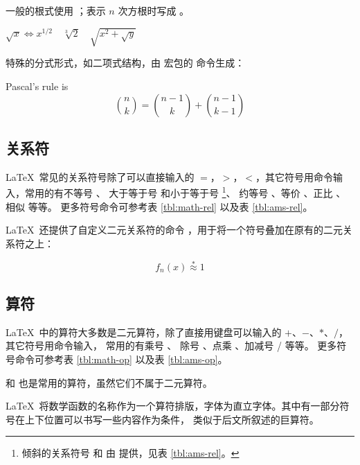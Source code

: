 一般的根式使用 ；表示 $n$ 次方根时写成 。
\begin{example}
$\sqrt{x} \Leftrightarrow x^{1/2}
\quad \sqrt[3]{2}
\quad \sqrt{x^{2} + \sqrt{y}}$
\end{example}

特殊的分式形式，如二项式结构，由  宏包的  命令生成：
\begin{example}
Pascal's rule is
\[
\binom{n}{k} =\binom{n-1}{k}
+ \binom{n-1}{k-1}
\]
\end{example}

\subsection{关系符}\label{subsec:math-rel}

\LaTeX\ 常见的关系符号除了可以直接输入的 $=$，$>$，$<$，其它符号用命令输入，常用的有不等号 、
大于等于号  和小于等于号 %
\footnote{倾斜的关系符号  和  由  提供，见表 \ref{tbl:ams-rel}。}、
约等号 、等价 、正比 、相似  等等。
更多符号命令可参考表 \ref{tbl:math-rel} 以及表 \ref{tbl:ams-rel}。

\LaTeX\ 还提供了自定义二元关系符的命令 ，用于将一个符号叠加在原有的二元关系符之上：
\begin{example}
\[
f_n(x) \stackrel{*}{\approx} 1
\]
\end{example}

\subsection{算符}\label{subsec:math-op}

\LaTeX\ 中的算符大多数是二元算符，除了直接用键盘可以输入的 $+$、$-$、$*$、$/$，其它符号用命令输入，
常用的有乘号 、 除号 、点乘 、加减号  /  等等。
更多符号命令可参考表 \ref{tbl:math-op} 以及表 \ref{tbl:ams-op}。

 和  也是常用的算符，虽然它们不属于二元算符。

\LaTeX\ 将数学函数的名称作为一个算符排版，字体为直立字体。其中有一部分符号在上下位置可以书写一些内容作为条件，
类似于后文所叙述的巨算符。

